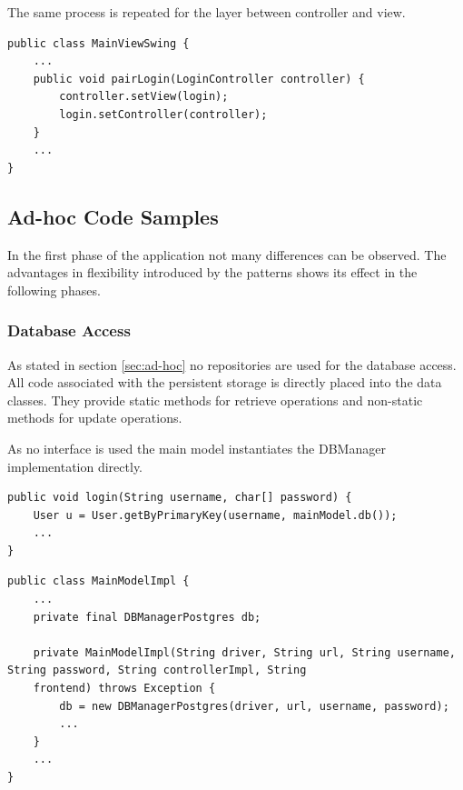 \clearpage

The same process is repeated for the layer between controller and view. 

\begin{lstlisting}[caption={[Code snipped showing pairing code between a sub-controller and a sub-view.]Code snipped showing pairing code between a sub-controller and a sub-view. The pairing between the model and controller layer works in a very similar way.}, captionpos=b, label={lst:pairing}]
public class MainViewSwing {
	...
	public void pairLogin(LoginController controller) {
		controller.setView(login);
		login.setController(controller);
	}
	...
}
\end{lstlisting}
   
\subsection{Ad-hoc Code Samples}
In the first phase of the application not many differences can be observed. The advantages in flexibility introduced by the patterns shows its effect in the following phases. 

\subsubsection{Database Access}
As stated in section \ref{sec:ad-hoc} no repositories are used for the database access. All code associated with the persistent storage is directly placed into the data classes. They provide static methods for retrieve operations and non-static methods for update operations. 

As no interface is used the main model instantiates the DBManager implementation directly. 

\begin{lstlisting}[caption={[Code snipped showing database access in the ad-hoc program version. ]Code snipped showing database access in the ad-hoc program version. All database code is placed into the corresponding data class, retrieval methods are static and take the corresponding DBManager as parameter. The reference to the DBManager is provided by a getter method of the main model, as in listing \ref{lst:db-access-bp}.}, captionpos=b]
public void login(String username, char[] password) {
	User u = User.getByPrimaryKey(username, mainModel.db()); 
	...
}
\end{lstlisting}

\begin{lstlisting}[caption={[Code snippet showing how the DBManager is instantiated. ]Code snippet showing how the DBManager is instantiated. Again no interfaces but rather concrete implementations are used. The singleton class seen in listing \ref{lst:dbmanager} does not exist in the ad-hoc version.}, captionpos=b]
public class MainModelImpl {
	...
	private final DBManagerPostgres db;
	
	private MainModelImpl(String driver, String url, String username, String password, String controllerImpl, String
	frontend) throws Exception {
		db = new DBManagerPostgres(driver, url, username, password);
		...
	}
	...
}
\end{lstlisting}

